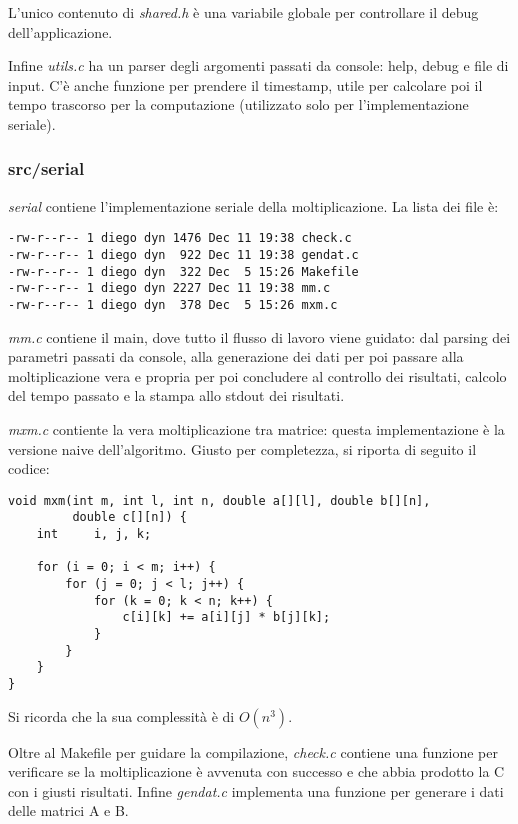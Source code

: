 L'unico contenuto di \textit{shared.h} \`{e} una variabile globale per controllare il debug dell'applicazione.

Infine \textit{utils.c} ha un parser degli argomenti passati da console: help, debug e file di input. C'\`{e} anche funzione per prendere il timestamp, utile per calcolare poi il tempo trascorso per la computazione (utilizzato solo per l'implementazione seriale).

\subsubsection{src/serial}
\textit{serial} contiene l'implementazione seriale della moltiplicazione. La lista dei file \`{e}:

\begin{lstlisting}
-rw-r--r-- 1 diego dyn 1476 Dec 11 19:38 check.c
-rw-r--r-- 1 diego dyn  922 Dec 11 19:38 gendat.c
-rw-r--r-- 1 diego dyn  322 Dec  5 15:26 Makefile
-rw-r--r-- 1 diego dyn 2227 Dec 11 19:38 mm.c
-rw-r--r-- 1 diego dyn  378 Dec  5 15:26 mxm.c
\end{lstlisting}

\textit{mm.c} contiene il main, dove tutto il flusso di lavoro viene guidato: dal parsing dei parametri passati da console, alla generazione dei dati per poi passare alla moltiplicazione vera e propria per poi concludere al controllo dei risultati, calcolo del tempo passato e la stampa allo stdout dei risultati.

\textit{mxm.c} contiente la vera moltiplicazione tra matrice: questa implementazione \`{e} la versione naive dell'algoritmo. Giusto per completezza, si riporta di seguito il codice:

\begin{lstlisting}
void mxm(int m, int l, int n, double a[][l], double b[][n],
         double c[][n]) {
    int     i, j, k;

    for (i = 0; i < m; i++) {
        for (j = 0; j < l; j++) {
            for (k = 0; k < n; k++) {
                c[i][k] += a[i][j] * b[j][k];
            }
        }
    }
}
\end{lstlisting}

Si ricorda che la sua complessit\`{a} \`{e} di $O(n^3)$.

Oltre al Makefile per guidare la compilazione, \textit{check.c} contiene una funzione per verificare se la moltiplicazione \`{e} avvenuta con successo e che abbia prodotto la C con i giusti risultati. Infine \textit{gendat.c} implementa una funzione per generare i dati delle matrici A e B.


